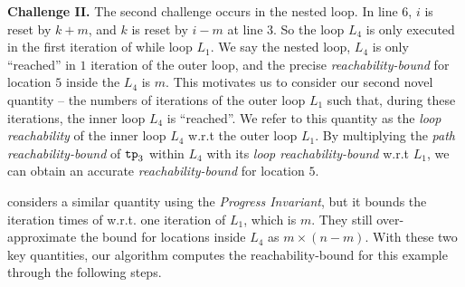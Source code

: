 \textbf{Challenge II.} 
The second challenge occurs in the nested loop.
In line 6, $i$ is reset by $k + m$, and $k$ is reset by $i - m$ at line 3. So the
loop $L_4$ is only executed in the first iteration of while loop $L_1$.
We say the nested loop, $L_4$ is only ``reached'' in $1$ iteration of the outer loop,
and the precise \emph{reachability-bound} for location $5$ inside the $L_4$ is $m$.
This motivates us to consider our second novel quantity --
the numbers of iterations of the {outer loop $L_1$} such that,
during these iterations, the inner loop $L_4$ is ``reached''.
We refer to this quantity as the \emph{loop reachability} of the inner loop $L_4$ w.r.t the outer loop $L_1$.
By multiplying the \emph{path reachability-bound} of $\mathtt{tp}_3$ within $L_4$
with its \emph{loop reachability-bound} w.r.t $L_1$, we can obtain an accurate
\emph{reachability-bound} for location $5$.

\cite{GulwaniJK09} considers a similar quantity using the \emph{Progress Invariant}, but it bounds the iteration times of  w.r.t. one iteration of $L_1$, which is $m$. They still over-approximate the bound for locations inside $L_4$ as $m \times (n - m)$.
With these two key quantities, our algorithm computes the reachability-bound for this example through the following steps.
